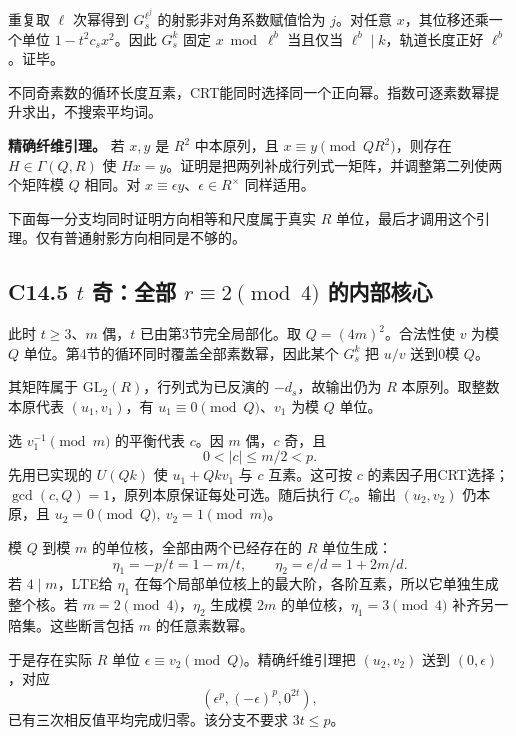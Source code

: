 \documentclass[11pt,a4paper]{article}
\theoremstyle{definition}
\numberwithin{equation}{section}
\begin{document}
{重复取} \(\ell\) {次幂得到} \(G_s^{\ell^j}\) {的射影非对角系数赋值恰为} \(j\){。对任意} \(x\){，其位移还乘一个单位} \(1-t^2c_sx^2\){。因此} \(G_s^k\) {固定} \(x\bmod\ell^b\) {当且仅当} \(\ell^b\mid k\){，轨道长度正好} \(\ell^b\){。证毕。}

{不同奇素数的循环长度互素，CRT能同时选择同一个正向幂。指数可逐素数幂提升求出，不搜索平均词。}

\textbf{{精确纤维引理。}} {若} \(x,y\) {是} \(R^2\) {中本原列，且} \(x\equiv y\pmod{QR^2}\){，则存在} \(H\in\Gamma(Q,R)\) {使} \(Hx=y\){。证明是把两列补成行列式一矩阵，并调整第二列使两个矩阵模} \(Q\) {相同。对} \(x\equiv\epsilon y\){、}\(\epsilon\in R^\times\) {同样适用。}

{下面每一分支均同时证明方向相等和尺度属于真实} \(R\) {单位，最后才调用这个引理。仅有普通射影方向相同是不够的。}

\subsection*{\texorpdfstring{{C14.5} \(t\) {奇：全部} \(r\equiv2\pmod4\) {的内部核心}}{C14.5 t 奇：全部 r\textbackslash equiv2\textbackslash pmod4 的内部核心}}\label{C14-h97}

{此时} \(t\ge3\){、}\(m\) {偶，}\(t\) {已由第3节完全局部化。取} \(Q=(4m)^2\){。合法性使} \(v\) {为模} \(Q\) {单位。第4节的循环同时覆盖全部素数幂，因此某个} \(G_s^k\) {把} \(u/v\) {送到0模} \(Q\){。}

{其矩阵属于} \(\mathrm{GL}_2(R)\){，行列式为已反演的} \(-d_s\){，故输出仍为} \(R\) {本原列。取整数本原代表} \((u_1,v_1)\){，有} \(u_1\equiv0\pmod Q\){、}\(v_1\) {为模} \(Q\) {单位。}

{选} \(v_1^{-1}\pmod m\) {的平衡代表} \(c\){。因} \(m\) {偶，}\(c\) {奇，且} \[
0<|c|\le m/2<p.
\] {先用已实现的} \(U(Qk)\) {使} \(u_1+Qkv_1\) {与} \(c\) {互素。这可按} \(c\) {的素因子用CRT选择；}\(\gcd(c,Q)=1\){，原列本原保证每处可选。随后执行} \(C_c\){。输出} \((u_2,v_2)\) {仍本原，且} \(u_2=0\pmod Q,\ v_2=1\pmod m\){。}

{模} \(Q\) {到模} \(m\) {的单位核，全部由两个已经存在的} \(R\) {单位生成：} \[
\eta_1=-p/t=1-m/t,\qquad \eta_2=e/d=1+2m/d.\tag{C14.9}
\] {若} \(4\mid m\){，LTE给} \(\eta_1\) {在每个局部单位核上的最大阶，各阶互素，所以它单独生成整个核。若} \(m=2\pmod4\){，}\(\eta_2\) {生成模} \(2m\) {的单位核，}\(\eta_1=3\pmod4\) {补齐另一陪集。这些断言包括} \(m\) {的任意素数幂。}

{于是存在实际} \(R\) {单位} \(\epsilon\equiv v_2\pmod Q\){。精确纤维引理把} \((u_2,v_2)\) {送到} \((0,\epsilon)\){，对应} \[
(\epsilon^p,(-\epsilon)^p,0^{2t}),
\] {已有三次相反值平均完成归零。该分支不要求} \(3t\le p\){。}
\end{document}
